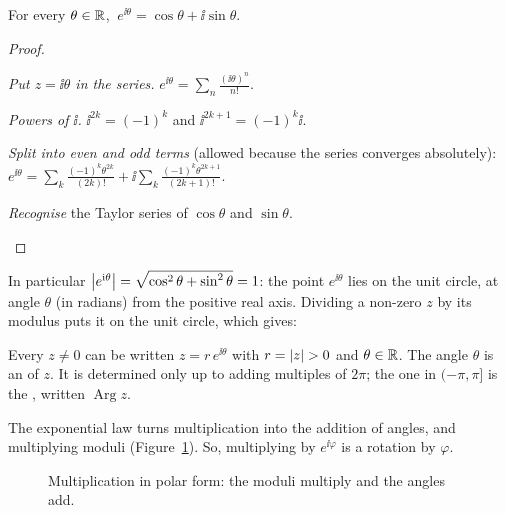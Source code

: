 \begin{theorem}\label{thm:euler}
  For every $\theta\in\mathbb{R}$, $\ e^{\ii\theta}=\cos\theta+\ii\sin\theta$.
\end{theorem}
\begin{proof}
  \begin{steps}
    \item \emph{Put $z=\ii\theta$ in the series.} $e^{\ii\theta}=\sum_n\frac{(\ii\theta)^n}{n!}$.
    \item \emph{Powers of $\ii$.} $\ii^{2k}=(-1)^k$ and $\ii^{2k+1}=(-1)^k\ii$.
    \item \emph{Split into even and odd terms} (allowed because the series converges absolutely): $e^{\ii\theta}=\sum_{k}\frac{(-1)^k\theta^{2k}}{(2k)!}+\ii\sum_k\frac{(-1)^k\theta^{2k+1}}{(2k+1)!}$.
    \item \emph{Recognise} the Taylor series of $\cos\theta$ and $\sin\theta$. \qedhere
  \end{steps}
\end{proof}

In particular $\left|e^{\mathrm{i}\theta}\right|=\sqrt{\cos^2\theta+\sin^2\theta}=1$: the point $e^{\ii\theta}$ lies on the unit circle, at angle $\theta$ (in radians) from the positive real axis. Dividing a non-zero $z$ by its modulus puts it on the unit circle, which gives:

\begin{definition}\label{def:polar}
  Every $z\ne0$ can be written $z=r\,e^{\ii\theta}$ with $r=\abs{z}>0$ and $\theta\in\mathbb{R}$. The angle $\theta$ is an  of $z$. It is determined only up to adding multiples of $2\pi$; the one in $(-\pi,\pi]$ is the , written $\operatorname{Arg}z$.
\end{definition}

The exponential law turns multiplication into the addition of angles, and multiplying moduli (Figure~\ref{fig:polar}). So, multiplying by $e^{\ii\varphi}$ is a rotation by $\varphi$.

\begin{figure}[htb]
  \centering
  \caption{Multiplication in polar form: the moduli multiply and the angles add.}
  \label{fig:polar}
\end{figure}


